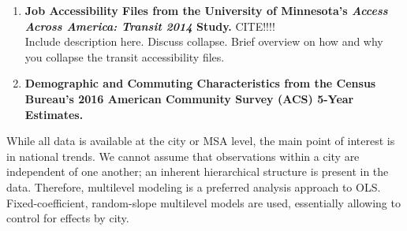 \documentclass[paper=letter, fontsize=12pt]{scrartcl} %
\begin{document}
\begin{enumerate}
\begin{enumerate}
	\end{enumerate}
	\item \textbf{Job Accessibility Files from the University of Minnesota's \textit{Access Across America: Transit 2014} Study.} CITE!!!! \\
	Include description here. Discuss collapse. Brief overview on how and why you collapse the transit accessibility files.
	\item \textbf{Demographic and Commuting Characteristics from the Census Bureau's 2016 American Community Survey (ACS) 5-Year Estimates.} \cite{acs16}\\
\end{enumerate}
While all data is available at the city or MSA level, the main point of interest is in national trends. We cannot assume that observations within a city are independent of one another; an inherent hierarchical structure is present in the data. Therefore, multilevel modeling is a preferred analysis approach to OLS. Fixed-coefficient, random-slope multilevel models are used, essentially allowing to control for effects by city.
\end{document}
